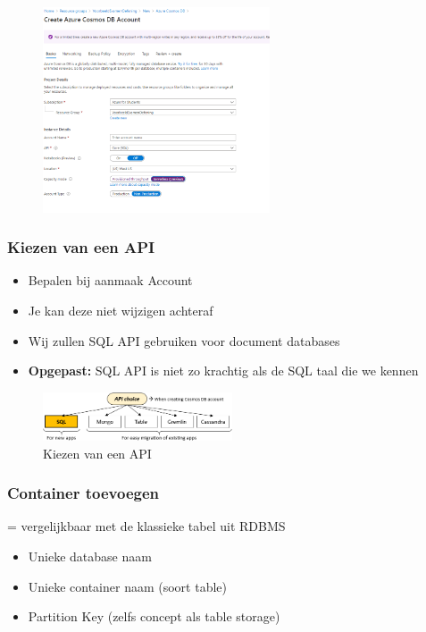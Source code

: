 \documentclass{article}
\newcommand{\bold}[1]{\textbf{#1}}
\begin{document}
\begin{figure}[H]
    \centering
    \includegraphics[width=0.6\textwidth]{cosmosdb-api-account.png}
    \caption{}
\end{figure}

\subsubsection{Kiezen van een API}

\begin{itemize}
    \item Bepalen bij aanmaak Account
    \item Je kan deze niet wijzigen achteraf
    \item Wij zullen SQL API gebruiken voor document databases
    \item \bold{Opgepast:} SQL API is niet zo krachtig als de SQL taal die we kennen
\end{itemize}

\begin{figure}[H]
    \centering
    \includegraphics[width=0.5\textwidth]{cosmosdb-api-choice.png}
    \caption{Kiezen van een API}
\end{figure}


\subsubsection{Container toevoegen}

= vergelijkbaar met de klassieke tabel uit RDBMS

\begin{itemize}
    \item Unieke database naam
    \item Unieke container naam (soort table)
    \item Partition Key (zelfs concept als table storage)
\end{itemize}
\end{document}
